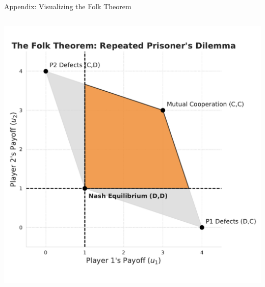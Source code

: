 \documentclass[10pt, aspectratio=169]{beamer}
\begin{document}
\begin{frame}{Appendix: Visualizing the Folk Theorem}\label{app:ft}
    \begin{columns}[T]
    
    \begin{column}{0.55\textwidth}
        \centering
        \includegraphics[width=\textwidth]{latex/slides_pricing_collusion/imgs/ft_plot.pdf}
    \end{column}
    

\end{columns}
\end{frame}
\end{document}
